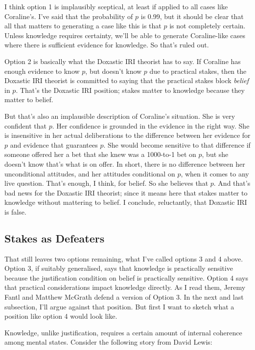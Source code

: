 \noindent I think option 1 is implausibly sceptical, at least if applied to all cases like Coraline's. I've said that the probability of $p$ is 0.99, but it should be clear that all that matters to generating a case like this is that $p$ is not completely certain. Unless knowledge requires certainty, we'll be able to generate Coraline-like cases where there is sufficient evidence for knowledge. So that's ruled out.

Option 2 is basically what the Doxastic IRI theorist has to say. If Coraline has enough evidence to know $p$, but doesn't know $p$ due to practical stakes, then the Doxastic IRI theorist is committed to saying that the practical stakes block \textit{belief} in $p$. That's the Doxastic IRI position; stakes matter to knowledge because they matter to belief.

But that's also an implausible description of Coraline's situation. She is very confident that $p$. Her confidence is grounded in the evidence in the right way. She is insensitive in her actual deliberations to the difference between her evidence for $p$ and evidence that guarantees $p$. She would become sensitive to that difference if someone offered her a bet that she knew was a 1000-to-1 bet on $p$, but she doesn't know that's what is on offer. In short, there is no difference between her unconditional attitudes, and her attitudes conditional on $p$, when it comes to any live question. That's enough, I think, for belief. So she believes that $p$. And that's bad news for the Doxastic IRI theorist; since it means here that stakes matter to knowledge without mattering to belief. I conclude, reluctantly, that Doxastic IRI is false.

\subsection{Stakes as Defeaters}

That still leaves two options remaining, what I've called options 3 and 4 above. Option 3, if suitably generalised, says that knowledge is practically sensitive because the justification condition on belief is practically sensitive. Option 4 says that practical considerations impact knowledge directly. As I read them, Jeremy Fantl and Matthew McGrath defend a version of Option 3. In the next and last subsection, I'll argue against that position. But first I want to sketch what a position like option 4 would look like. 

Knowledge, unlike justification, requires a certain amount of internal coherence among mental states. Consider the following story from David Lewis:

